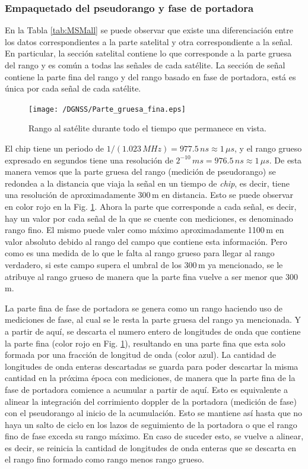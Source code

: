 \documentclass[a4paper,12pt,oneside,onecolumn,final,openright]{book}%
\begin{document}
\subsubsection{Empaquetado del pseudorango y fase de portadora}\label{sec:rrng_frng}
	En la Tabla \ref{tab:MSMall} se puede observar que existe una diferenciación entre los datos correspondientes a la parte satelital y otra correspondiente a la señal. En particular, la sección satelital contiene lo que corresponde a la parte gruesa del rango y es común a todas las señales de cada satélite. La sección de señal contiene la parte fina del rango y del rango basado en fase de portadora, está es única por cada señal de cada satélite. 
	
\begin{figure}
    \centering
    \texttt{[image: /DGNSS/Parte\_gruesa\_fina.eps]}
    \caption{Rango al satélite durante todo el tiempo que permanece en vista.}
    \label{fig:rrng_frng}
\end{figure}
	
	El chip tiene un periodo de $1/(1.023\,MHz) = 977.5\,ns \approx 1\,\mu s$, y el rango grueso expresado en segundos tiene una resolución de $2^{-10}\,ms = 976.5\,ns \approx 1\, \mu s$. De esta manera vemos que la parte gruesa del rango (medición de pseudorango) se redondea a la distancia que viaja la señal en un tiempo de \textit{chip}, es decir, tiene una resolución de aproximadamente 300\,m en distancia. Esto se puede observar en color rojo en la Fig. \ref{fig:rrng_frng}. Ahora la parte que corresponde a cada señal, es decir, hay un valor por cada señal de la que se cuente con mediciones, es denominado rango fino. El mismo puede valer como máximo aproximadamente 1100\,m en valor absoluto debido al rango del campo que contiene esta información. Pero como es una medida de lo que le falta al rango grueso para llegar al rango verdadero, si este campo supera el umbral de los 300\,m ya mencionado, se le atribuye al rango grueso de manera que la parte fina vuelve a ser menor que 300\,m.
	
	La parte fina de fase de portadora se genera como un rango haciendo uso de mediciones de fase, al cual se le resta la parte gruesa del rango ya mencionada. Y a partir de aquí, se descarta el numero entero de longitudes de onda que contiene la parte fina (color rojo en Fig. \ref{fig:rrng_frng}), resultando en una parte fina que esta solo formada por una fracción de longitud de onda (color azul). La cantidad de longitudes de onda enteras descartadas se guarda para poder descartar la misma cantidad en la próxima época con mediciones, de manera que la parte fina de la fase de portadora comience a acumular a partir de aquí. Esto es equivalente a alinear la integración del corrimiento doppler de la portadora (medición de fase) con el pseudorango al inicio de la acumulación. Esto se mantiene así hasta que no haya un salto de ciclo en los lazos de seguimiento de la portadora o que el rango fino de fase exceda su rango máximo. En caso de suceder esto, se vuelve a alinear, es decir, se reinicia la cantidad de longitudes de onda enteras que se descarta en el rango fino formado como rango menos rango grueso. 
	
\end{document}
